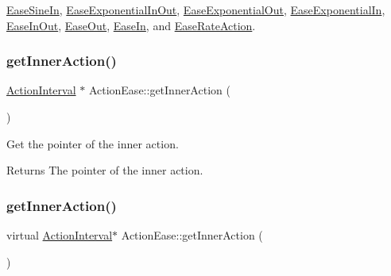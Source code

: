 \hyperlink{classEaseSineIn_a140c6fd97ab8a7d381fe5eebca3c4719}{Ease\+Sine\+In}, \hyperlink{classEaseExponentialInOut_a04bfa04ce8c396bdd5d058cfc771b9cb}{Ease\+Exponential\+In\+Out}, \hyperlink{classEaseExponentialOut_a484d36a99d2847cfa4f273d5ec73c209}{Ease\+Exponential\+Out}, \hyperlink{classEaseExponentialIn_a028a3801fc36418cf59018c457b8a102}{Ease\+Exponential\+In}, \hyperlink{classEaseInOut_a5bee2d31db0c1fefd2656c8eedd5831e}{Ease\+In\+Out}, \hyperlink{classEaseOut_aaa3ddcdc100a3378279054d596e87178}{Ease\+Out}, \hyperlink{classEaseIn_ac2db345fad4b62fa8485e6d40121a83c}{Ease\+In}, and \hyperlink{classEaseRateAction_a50323a94f7587203d7b02bb66fe2e67e}{Ease\+Rate\+Action}.

\mbox{\label{classActionEase_aa024b3c9b78949381d06af515ffeaf9e}} 
\subsubsection{\texorpdfstring{get\+Inner\+Action()}{getInnerAction()}\hspace{0.1cm}{\footnotesize\ttfamily [1/2]}}
{\footnotesize\ttfamily \hyperlink{classActionInterval}{Action\+Interval} $\ast$ Action\+Ease\+::get\+Inner\+Action (\begin{DoxyParamCaption}{ }\end{DoxyParamCaption})\hspace{0.3cm}{\ttfamily [virtual]}}



Get the pointer of the inner action. 

\begin{DoxyReturn}{Returns}
The pointer of the inner action. 
\end{DoxyReturn}
\mbox{\label{classActionEase_ac26a5049b514d8824361a6e8eb6b2fc4}} 
\subsubsection{\texorpdfstring{get\+Inner\+Action()}{getInnerAction()}\hspace{0.1cm}{\footnotesize\ttfamily [2/2]}}
{\footnotesize\ttfamily virtual \hyperlink{classActionInterval}{Action\+Interval}$\ast$ Action\+Ease\+::get\+Inner\+Action (\begin{DoxyParamCaption}{ }\end{DoxyParamCaption})\hspace{0.3cm}{\ttfamily [virtual]}}



